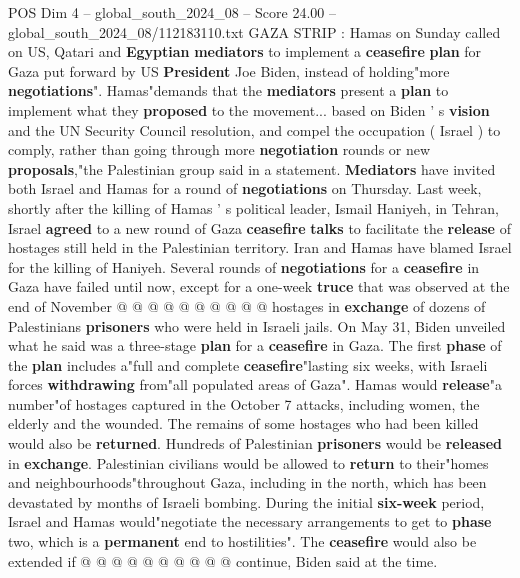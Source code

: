 \begin{textsample}{POS Dim 4 – global\_south\_2024\_08 – Score 24.00 – global\_south\_2024\_08/112183110.txt}  \label{ex:f4_pos_123}
GAZA STRIP : Hamas on Sunday called on US, Qatari and \textbf{Egyptian} \textbf{mediators} to implement a \textbf{ceasefire} \textbf{plan} for Gaza put forward by US \textbf{President} Joe Biden, instead of holding"more \textbf{negotiations}".
Hamas"demands that the \textbf{mediators} present a \textbf{plan} to implement what they \textbf{proposed} to the movement... based on Biden ' s \textbf{vision} and the UN Security Council resolution, and compel the occupation ( Israel ) to comply, rather than going through more \textbf{negotiation} rounds or new \textbf{proposals},"the Palestinian group said in a statement. \textbf{Mediators} have invited both Israel and Hamas for a round of \textbf{negotiations} on Thursday.
Last week, shortly after the killing of Hamas ' s political leader, Ismail Haniyeh, in Tehran, Israel \textbf{agreed} to a new round of Gaza \textbf{ceasefire} \textbf{talks} to facilitate the \textbf{release} of hostages still held in the Palestinian territory.
Iran and Hamas have blamed Israel for the killing of Haniyeh.
Several rounds of \textbf{negotiations} for a \textbf{ceasefire} in Gaza have failed until now, except for a one-week \textbf{truce} that was observed at the end of November @ @ @ @ @ @ @ @ @ @ hostages in \textbf{exchange} of dozens of Palestinians \textbf{prisoners} who were held in Israeli jails.
On May 31, Biden unveiled what he said was a three-stage \textbf{plan} for a \textbf{ceasefire} in Gaza.
The first \textbf{phase} of the \textbf{plan} includes a"full and complete \textbf{ceasefire}"lasting six weeks, with Israeli forces \textbf{withdrawing} from"all populated areas of Gaza".
Hamas would \textbf{release}"a number"of hostages captured in the October 7 attacks, including women, the elderly and the wounded.
The remains of some hostages who had been killed would also be \textbf{returned}.
Hundreds of Palestinian \textbf{prisoners} would be \textbf{released} in \textbf{exchange}.
Palestinian civilians would be allowed to \textbf{return} to their"homes and neighbourhoods"throughout Gaza, including in the north, which has been devastated by months of Israeli bombing.
During the initial \textbf{six-week} period, Israel and Hamas would"negotiate the necessary arrangements to get to \textbf{phase} two, which is a \textbf{permanent} end to hostilities".
The \textbf{ceasefire} would also be extended if @ @ @ @ @ @ @ @ @ @ continue, Biden said at the time.

\end{textsample}
